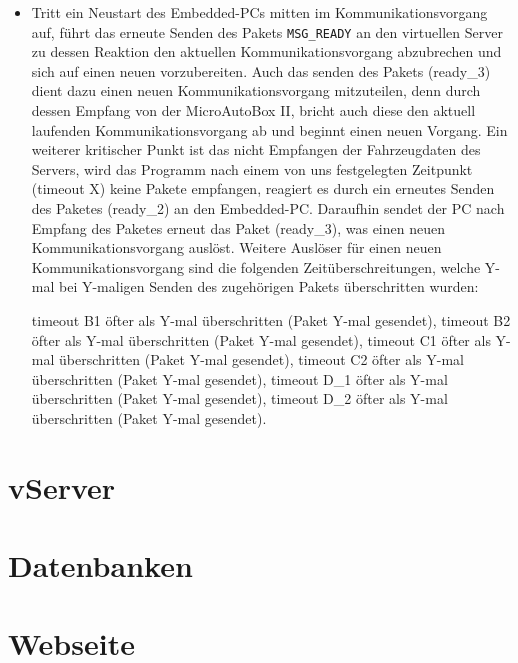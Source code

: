 \documentclass[fontsize = 12pt, paper = a4]{scrreprt}
\begin{document}
\begin{itemize}
\item
Tritt ein Neustart des Embedded-PCs mitten im Kommunikationsvorgang auf, führt das erneute Senden des Pakets \texttt{MSG\_READY} an den virtuellen Server zu dessen Reaktion den aktuellen Kommunikationsvorgang abzubrechen und sich auf einen neuen vorzubereiten. Auch das senden des Pakets (ready\_3) dient dazu einen neuen Kommunikationsvorgang mitzuteilen, denn durch dessen Empfang von der MicroAutoBox II, bricht auch diese den aktuell laufenden Kommunikationsvorgang ab und beginnt einen neuen Vorgang. Ein weiterer kritischer Punkt ist das nicht Empfangen der Fahrzeugdaten des Servers, wird das Programm nach einem von uns festgelegten Zeitpunkt (timeout X) keine Pakete empfangen, reagiert es durch ein erneutes Senden des Paketes (ready\_2) an den Embedded-PC. Daraufhin sendet der PC nach Empfang des Paketes erneut das Paket (ready\_3), was einen neuen Kommunikationsvorgang auslöst. Weitere Auslöser für einen neuen Kommunikationsvorgang sind die folgenden Zeitüberschreitungen, welche Y-mal bei Y-maligen Senden des zugehörigen Pakets überschritten wurden:

timeout B1 öfter als Y-mal überschritten (Paket Y-mal gesendet),
timeout B2 öfter als Y-mal überschritten (Paket Y-mal gesendet),
timeout C1 öfter als Y-mal überschritten (Paket Y-mal gesendet),
timeout C2 öfter als Y-mal überschritten (Paket Y-mal gesendet),
timeout D\_1 öfter als Y-mal überschritten (Paket Y-mal gesendet),
timeout D\_2 öfter als Y-mal überschritten (Paket Y-mal gesendet).

\end{itemize}



\section{vServer}


\section{Datenbanken}


\section{Webseite}
\end{document}
